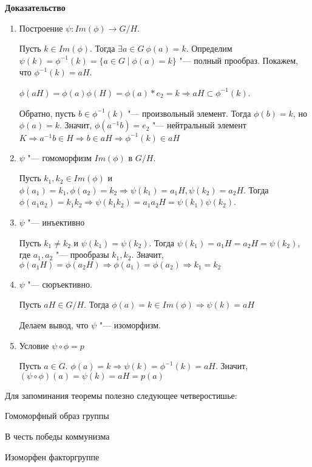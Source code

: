 \documentclass{article}
\begin{document}
\vspace{5pt}

\textbf{Доказательство}

\begin{enumerate}
	\item Построение $\psi: Im(\phi) \rightarrow G/H$.
	
	Пусть $k \in Im(\phi)$. Тогда $\exists a \in G \  \phi(a) = k$. Определим $\psi(k) = \phi^{-1}(k) = \{a \in G \mid \phi(a) = k\}$ "--- полный прообраз.
	Покажем, что $\phi^{-1}(k) = aH$.
	
	$\phi(aH) = \phi(a)\phi(H) = \phi(a)*e_2 = k \Rightarrow aH \subset \phi^{-1}(k)$.
	
	Обратно, пусть $b \in \phi^{-1}(k)$ "--- произвольный элемент. Тогда $\phi(b) = k$, но $\phi(a) = k$. Значит, $\phi(a^{-1}b) = e_2$ "--- нейтральный элемент $K \Rightarrow a^{-1}b \in H \Rightarrow b \in aH \Rightarrow \phi^{-1}(k) \in aH$
	\item $\psi$ "--- гомоморфизм $Im(\phi)$ в $G/H$.
	
	Пусть $k_1, k_2 \in Im(\phi)$ и $\phi(a_1) = k_1, \phi(a_2) = k_2 \Rightarrow \psi(k_1) = a_1H, \psi(k_2) = a_2H$. Тогда $\phi(a_1a_2) = k_1k_2 \Rightarrow \psi(k_1k_2) = a_1a_2H = \psi(k_1)\psi(k_2)$.
	\item $\psi$ "--- инъективно
	
	Пусть $k_1 \neq k_2$ и $\psi(k_1) = \psi(k_2)$. Тогда $\psi(k_1) = a_1H = a_2H = \psi(k_2)$, где $a_1, a_2$ "--- прообразы $k_1, k_2$. Значит, $\phi(a_1H) = \phi(a_2H) \Rightarrow \phi(a_1) = \phi(a_2) \Rightarrow k_1 = k_2$
	\item $\psi$ "--- сюръективно.
	
	Пусть $aH \in G/H$. Тогда $\phi(a) = k \in Im(\phi) \Rightarrow \psi(k) = aH$
	
	Делаем вывод, что $\psi$ "--- изоморфизм.
	\item Условие $\psi \circ \phi = p$
	
	Пусть $a \in G$. $\phi(a) = k \Rightarrow \psi(k) = \phi^{-1}(k) = aH$. Значит, $(\psi \circ \phi)(a) = \psi(k) = aH = p(a)$
\end{enumerate}

\vspace{10pt}

Для запоминания теоремы полезно следующее четверостишье:

Гомоморфный образ группы

В честь победы коммунизма

Изоморфен факторгруппе
\end{document}
